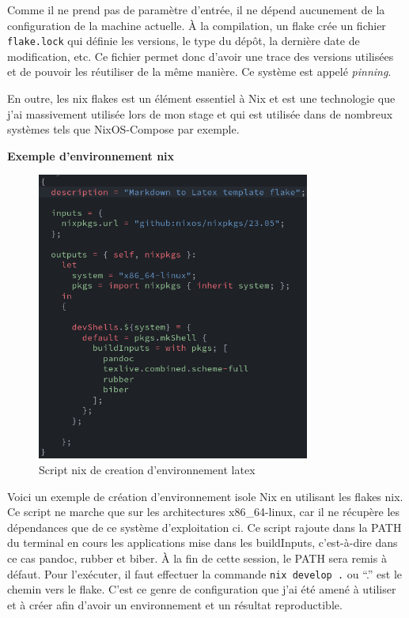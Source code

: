 \documentclass[a4paper,french,12pt, titlepage]{article}
\begin{document}
Comme il ne prend pas de paramètre d'entrée, il ne dépend aucunement de
la configuration de la machine actuelle. À la compilation, un flake crée
un fichier \texttt{flake.lock} qui définie les versions, le type du
dépôt, la dernière date de modification, etc. Ce fichier permet donc
d'avoir une trace des versions utilisées et de pouvoir les réutiliser de
la même manière. Ce système est appelé \emph{pinning}.\newline

En outre, les nix flakes est un élément essentiel à Nix et est une
technologie que j'ai massivement utilisée lors de mon stage et qui est
utilisée dans de nombreux systèmes tels que NixOS-Compose par
exemple.\newline

\textbf{Exemple d'environnement nix}\newline

\begin{figure}[h]
\centering
\includegraphics[width=0.8\textwidth,height=0.8\textheight,keepaspectratio]{images/flakebasenix.png}
\caption{Script nix de creation d'environnement latex}
\end{figure}

Voici un exemple de création d'environnement isole Nix en utilisant les
flakes nix. Ce script ne marche que sur les architectures x86\_64-linux,
car il ne récupère les dépendances que de ce système d'exploitation ci.
Ce script rajoute dans la PATH du terminal en cours les applications
mise dans les buildInputs, c'est-à-dire dans ce cas pandoc, rubber et
biber. À la fin de cette session, le PATH sera remis à défaut. Pour
l'exécuter, il faut effectuer la commande \texttt{nix\ develop\ .} ou
``.'' est le chemin vers le flake. C'est ce genre de configuration que
j'ai été amené à utiliser et à créer afin d'avoir un environnement et un
résultat reproductible.\newline
\end{document}

